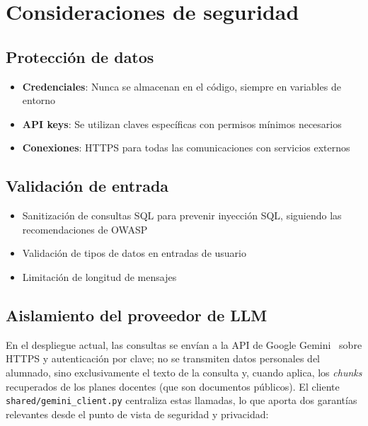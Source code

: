 \section{Consideraciones de seguridad}\label{sec:seguridad}

\subsection{Protección de datos}

\begin{itemize}
    \item \textbf{Credenciales}: Nunca se almacenan en el código, siempre en variables de entorno
    \item \textbf{API keys}: Se utilizan claves específicas con permisos mínimos necesarios
    \item \textbf{Conexiones}: HTTPS para todas las comunicaciones con servicios externos
\end{itemize}

\subsection{Validación de entrada}

\begin{itemize}
    \item Sanitización de consultas SQL para prevenir inyección SQL, siguiendo las recomendaciones de OWASP~\cite{owasp2021injection}
    \item Validación de tipos de datos en entradas de usuario
    \item Limitación de longitud de mensajes
\end{itemize}

\subsection{Aislamiento del proveedor de LLM}

En el despliegue actual, las consultas se envían a la API de Google Gemini~\cite{geminidocs} sobre HTTPS y autenticación por clave; no se transmiten datos personales del alumnado, sino exclusivamente el texto de la consulta y, cuando aplica, los \textit{chunks} recuperados de los planes docentes (que son documentos públicos). El cliente \texttt{shared/gemini\_client.py} centraliza estas llamadas, lo que aporta dos garantías relevantes desde el punto de vista de seguridad y privacidad:

